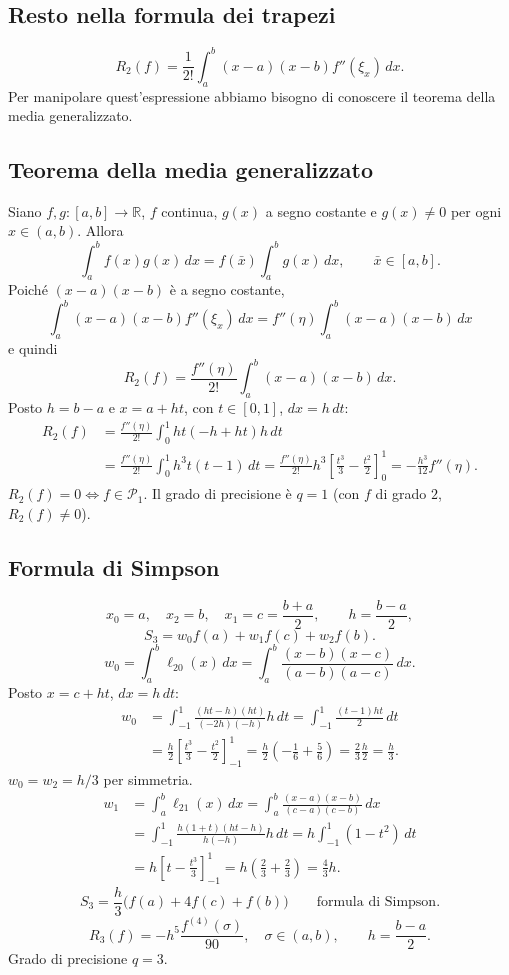\subsection*{Resto nella formula dei trapezi}
\[R_2(f)=\frac1{2!}\int_a^b(x-a)(x-b)f''(\xi_x)\,dx.\]
Per manipolare quest'espressione abbiamo bisogno di conoscere il teorema della media generalizzato.
\subsection*{Teorema della media generalizzato}
Siano $f,g:[a,b]\to\mathbb R$, $f$ continua, $g(x)$ a segno costante e $g(x)\ne0$ per ogni $x\in(a,b)$. Allora
\[\int_a^b f(x)g(x)\,dx=f(\bar x)\int_a^b g(x)\,dx,\qquad\bar x\in[a,b].\]
Poiché $(x-a)(x-b)$ è a segno costante,
\[\int_a^b(x-a)(x-b)f''(\xi_x)\,dx=f''(\eta)\int_a^b(x-a)(x-b)\,dx\]
e quindi
\[R_2(f)=\frac{f''(\eta)}{2!}\int_a^b(x-a)(x-b)\,dx.\]
Posto $h=b-a$ e $x=a+ht$, con $t\in[0,1]$, $dx=h\,dt$:
\begin{align*}
R_2(f)&=\frac{f''(\eta)}{2!}\int_0^1 ht(-h+ht)h\,dt\\
&=\frac{f''(\eta)}{2!}\int_0^1 h^3t(t-1)\,dt
=\frac{f''(\eta)}{2!}h^3\left[\frac{t^3}3-\frac{t^2}2\right]_0^1
=-\frac{h^3}{12}f''(\eta).
\end{align*}
$R_2(f)=0\Longleftrightarrow f\in\mathcal P_1$. Il grado di precisione è $q=1$ (con $f$ di grado $2$, $R_2(f)\ne0$).
\subsection*{Formula di Simpson}
\[x_0=a,\quad x_2=b,\quad x_1=c=\frac{b+a}2,\qquad h=\frac{b-a}2,\]
\[S_3=w_0f(a)+w_1f(c)+w_2f(b).\]
\[w_0=\int_a^b\ell_{20}(x)\,dx=\int_a^b\frac{(x-b)(x-c)}{(a-b)(a-c)}\,dx.\]
Posto $x=c+ht$, $dx=h\,dt$:
\begin{align*}
w_0&=\int_{-1}^1\frac{(ht-h)(ht)}{(-2h)(-h)}h\,dt
=\int_{-1}^1\frac{(t-1)ht}2\,dt\\
&=\frac h2\left[\frac{t^3}3-\frac{t^2}2\right]_{-1}^1
=\frac h2\left(-\frac16+\frac56\right)=\frac23\frac h2=\frac h3.
\end{align*}
$w_0=w_2=h/3$ per simmetria.
\begin{align*}
w_1&=\int_a^b\ell_{21}(x)\,dx=\int_a^b\frac{(x-a)(x-b)}{(c-a)(c-b)}\,dx\\
&=\int_{-1}^1\frac{h(1+t)(ht-h)}{h(-h)}h\,dt
=h\int_{-1}^1(1-t^2)\,dt\\
&=h\left[t-\frac{t^3}3\right]_{-1}^1=h\left(\frac23+\frac23\right)=\frac43h.
\end{align*}
\[\boxed{S_3=\frac h3\bigl(f(a)+4f(c)+f(b)\bigr)}\qquad\text{formula di Simpson}.\]
\[\boxed{R_3(f)=-h^5\frac{f^{(4)}(\sigma)}{90}},\quad\sigma\in(a,b),\qquad h=\frac{b-a}2.\]
Grado di precisione $q=3$.
